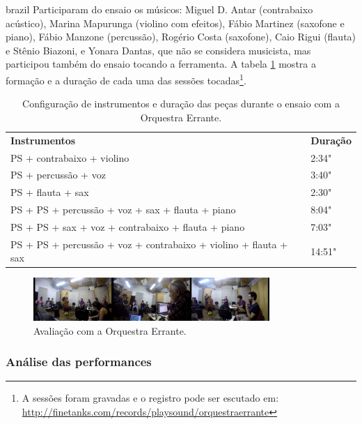 \begin{otherlanguage*}{brazil}
Participaram do ensaio os músicos: Miguel D. Antar (contrabaixo acústico), Marina Mapurunga (violino com efeitos), Fábio Martinez (saxofone e piano), Fábio Manzone (percussão), Rogério Costa (saxofone), Caio Rigui (flauta) e Stênio Biazoni, e Yonara Dantas, que não se considera musicista, mas participou também do ensaio tocando a ferramenta. A tabela \ref{tab:orchestra} mostra a formação e a duração de cada uma das sessões tocadas\footnote{A sessões foram gravadas e o registro pode ser escutado em: \url{http://finetanks.com/records/playsound/orquestraerrante}}.  

\begin{table}[ht]
\caption{Configuração de instrumentos e duração das peças durante o ensaio com a Orquestra Errante.}
\begin{tabular}{ll}
\textbf{Instrumentos}                                                    & \textbf{Duração} \\
PS + contrabaixo + violino                                & 2:34"         \\
PS + percussão + voz                                                 & 3:40"         \\
PS + flauta + sax                                                        & 2:30"         \\
PS + PS + percussão + voz + sax + flauta + piano                      & 8:04"         \\
PS + PS + sax + voz + contrabaixo + flauta + piano                   & 7:03"         \\
PS + PS + percussão + voz + contrabaixo + violino + flauta + sax & 14:51"       
\end{tabular}
\label{tab:orchestra}
\end{table}



\begin{figure}
\centering
\includegraphics[width=0.8\textwidth]{pictures/cap4/orquestra_errante_usertest}
\caption{\label{psorquestra}Avaliação com a Orquestra Errante.}
\label{fig:psorquestra}
\end{figure}

\subsubsection{Análise das performances}


\end{otherlanguage*}
